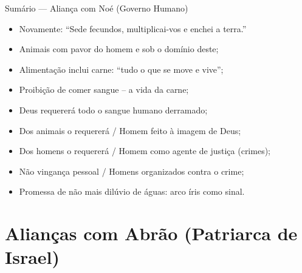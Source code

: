 \documentclass[12pt,aspectratio=169]{beamer}
\newcommand{\RED}[1]{{\textcolor{TXred}{#1}}}
\newcommand{\ORA}[1]{{\textcolor{TXred!50!TXyel}{#1}}}
\newcommand{\YEL}[1]{{\textcolor{TXyel}{#1}}}
\newcommand{\GRE}[1]{{\textcolor{TXgre}{#1}}}
\newcommand{\CYA}[1]{{\textcolor{TXcya}{#1}}}
\newcommand{\BLU}[1]{{\textcolor{TXblu}{#1}}}
\newcommand{\MAG}[1]{{\textcolor{TXmag}{#1}}}
\begin{document}
    \begin{frame}
        \par\noindent\hspace*{0.05\linewidth}%
        \begin{minipage}{0.9\linewidth}%
            \large%
            \begin{alertblock}{Sumário --- Aliança com Noé (Governo Humano)}
                \normalsize
                \begin{itemize}
                    \item<1-> Novamente: ``Sede \YEL{fecundos}, \GRE{multiplicai-vos} e
                        \CYA{enchei} a \ORA{terra}.''
                    \item<1-> Animais com pavor do homem e sob o \YEL{domínio} deste;
                    \item<1-> Alimentação inclui \YEL{carne}: ``tudo o que se \YEL{move} e
                        \YEL{vive}'';
                    \item<1-> Proibição de comer \RED{sangue} -- a \YEL{vida} da carne;
                    \item<2-> Deus requererá todo o \RED{sangue} humano derramado;
                    \item<2-> Dos \YEL{animais} o requererá / \GRE{Homem} feito \CYA{à imagem de
                        Deus};
                    \item<2-> Dos \YEL{homens} o requererá / \GRE{Homem} como \YEL{agente de
                        justiça} (crimes);
                    \item<2-> Não \RED{vingança pessoal} / Homens \YEL{organizados} contra o
                        crime;
                    \item<2-> \RED{Promessa} \ORA{de não mais} \YEL{dilúvio} \GRE{de águas:}
                        \CYA{arco íris} \BLU{como} \MAG{sinal.}
                \end{itemize}
            \end{alertblock}
        \end{minipage}%
    \end{frame}

\section{Alianças com Abrão (Patriarca de Israel)}
\end{document}
